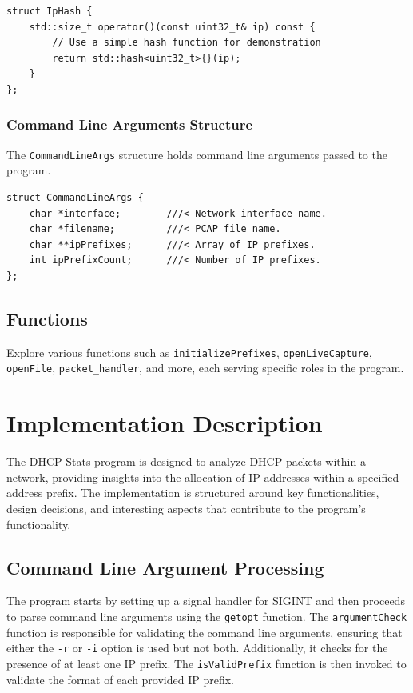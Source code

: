 \documentclass[a4paper]{article}
\begin{document}
\begin{verbatim}
struct IpHash {
    std::size_t operator()(const uint32_t& ip) const {
        // Use a simple hash function for demonstration
        return std::hash<uint32_t>{}(ip);
    }
};
\end{verbatim}

\subsubsection{Command Line Arguments Structure}
The \texttt{CommandLineArgs} structure holds command line arguments passed to the program.

\begin{verbatim}
struct CommandLineArgs {
    char *interface;        ///< Network interface name.
    char *filename;         ///< PCAP file name.
    char **ipPrefixes;      ///< Array of IP prefixes.
    int ipPrefixCount;      ///< Number of IP prefixes.
};
\end{verbatim}

\subsection{Functions}
Explore various functions such as \texttt{initializePrefixes}, \texttt{openLiveCapture}, \texttt{openFile}, \texttt{packet\_handler}, and more, each serving specific roles in the program.

\newpage
\section{Implementation Description}

The DHCP Stats program is designed to analyze DHCP packets within a network, providing insights into the allocation of IP addresses within a specified address prefix. The implementation is structured around key functionalities, design decisions, and interesting aspects that contribute to the program's functionality.

\subsection{Command Line Argument Processing}

The program starts by setting up a signal handler for SIGINT and then proceeds to parse command line arguments using the \texttt{getopt} function. The \texttt{argumentCheck} function is responsible for validating the command line arguments, ensuring that either the \texttt{-r} or \texttt{-i} option is used but not both. Additionally, it checks for the presence of at least one IP prefix. The \texttt{isValidPrefix} function is then invoked to validate the format of each provided IP prefix.
\end{document}
